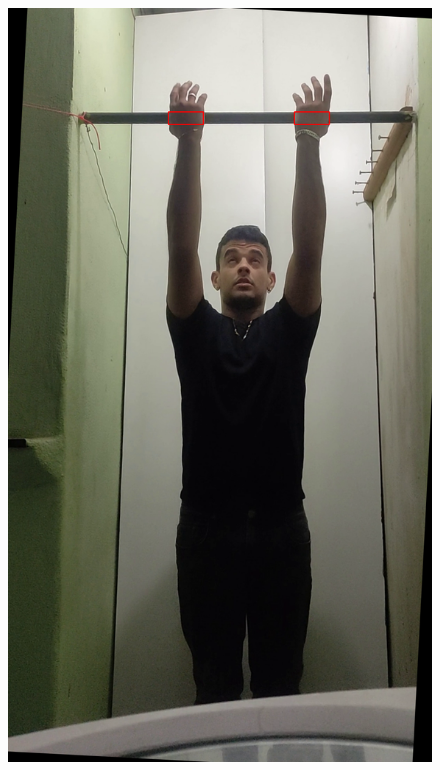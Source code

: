\begin{figure}[H]
\begin{minipage}{\sizeImg\textwidth}
        \end{minipage}
        \begin{minipage}{\sizeImg\textwidth}
            \includegraphics[width=\textwidth]{figuras/mao_barra/contornos.png}
        \end{minipage}
    \label{fig:binHand}
\end{figure}





